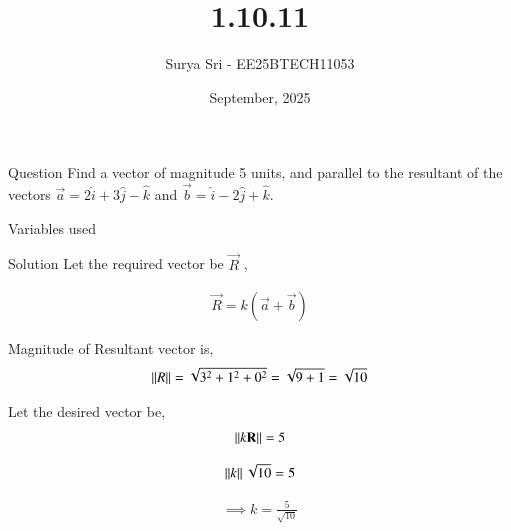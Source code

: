 \documentclass{beamer}
\title 
{1.10.11}
\date{September, 2025}
\author 
{Surya Sri - EE25BTECH11053}
\begin{document}
\frame{\titlepage}
\begin{frame}{Question}
Find a vector of magnitude 5 units, and parallel to the resultant of the vectors $\vec{a} = 2\hat{i} + 3\hat{j} - \hat{k}$ and $\vec{b} = \hat{i} - 2\hat{j} + \hat{k}$.
\end{frame}



\begin{frame}{Variables used}
\begin{table}[H]    
  \centering
  
  \caption{Variables Used}
  \label{tab:1.5.39}
\end{table}

\end{frame}

\begin{frame}{Solution}
Let the required vector be $\vec{R}$ ,

\begin{align}
    \vec{R} = k(\vec{a} + \vec{b})
\end{align}

Magnitude of Resultant vector is,
\begin{align}
\left\lVert R\right\rVert = \sqrt{3^2 + 1^2 + 0^2} = \sqrt{9 + 1} = \sqrt{10}
\end{align}

Let the desired vector be,
\begin{align}
    \left\lVert k\mathbf{R}\right\rVert = 5
\end{align}

\begin{align}
     \left\lVert k\right\rVert\sqrt{10} = 5 
\end{align}  

\begin{align}
\implies k = \frac{5}{\sqrt{10}}
\end{align}
 
\end{frame}
\end{document}
